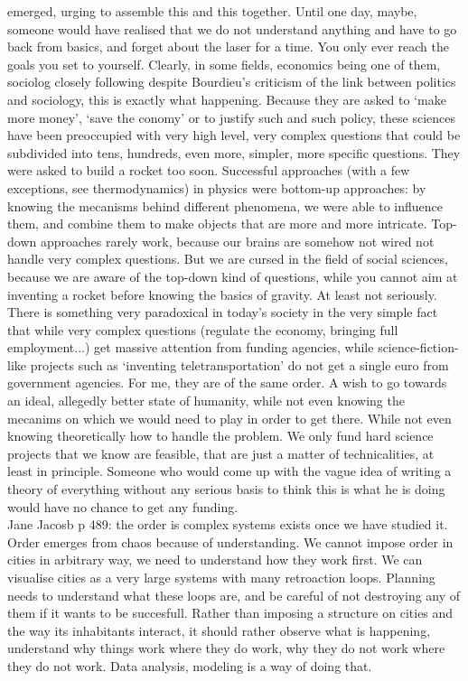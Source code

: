 emerged, urging to assemble this and this together. Until one day, maybe,
someone would have realised that we do not understand anything and have to go
back from basics, and forget about the laser for a time.
You only ever reach the goals you set to yourself.
Clearly, in some fields, economics being one of them, sociolog closely following
despite Bourdieu's criticism of the link between politics and sociology, this is
exactly what happening. Because they are asked to `make more money', `save the
conomy' or to justify such and such policy, these sciences have been preoccupied
with very high level, very complex questions that could be subdivided into tens,
hundreds, even more, simpler, more specific questions. They were asked to build
a rocket too soon. Successful approaches (with a few exceptions, see
thermodynamics) in physics were bottom-up approaches: by knowing the mecanisms
behind different phenomena, we were able to influence them, and combine them to
make objects that are more and more intricate. Top-down approaches rarely work,
because our brains are somehow not wired not handle very complex questions. But
we are cursed in the field of social sciences, because we are aware of the
top-down kind of questions, while you cannot aim at inventing a rocket before
knowing the basics of gravity. At least not seriously. There is something very
paradoxical in today's society in the very simple fact that while very complex
questions (regulate the economy, bringing full employment...) get massive
attention from funding agencies, while science-fiction-like projects such as
`inventing teletransportation' do not get a single euro from government
agencies. For me, they are of the same order. A wish to go towards an ideal,
allegedly better state of humanity, while not even knowing the mecanims on which
we would need to play in order to get there. While not even knowing
theoretically how to handle the problem. We only fund hard science projects that
we know are feasible, that are just a matter of technicalities, at least in
principle. Someone who would come up with the vague idea of writing a theory of
everything without any serious basis to think this is what he is doing would
have no chance to get any funding.\\

Jane Jacosb p 489: the order is complex systems exists once we have studied it.
Order emerges from chaos because of understanding. We cannot impose order in
cities in arbitrary way, we need to understand how they work first. We can
visualise cities as a very large systems with many retroaction loops. Planning
needs to understand what these loops are, and be careful of not destroying any
of them if it wants to be succesfull. Rather than imposing a structure on cities
and the way its inhabitants interact, it should rather observe what is
happening, understand why things work where they do work, why they do not work
where they do not work. Data analysis, modeling is a way of doing that.

